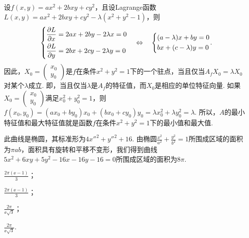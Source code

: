 \begin{solution}
  设$f(x,y)=ax^2+2bxy+cy^2$，且设Lagrange函数$L(x,y)=ax^2+2bxy+cy^2-\lambda(x^2+y^2-1)$，则
  \[
    \left\{
      \begin{aligned}
        & \pp Lx = 2ax + 2by - 2\lambda x = 0 \\
        & \pp Ly = 2bx + 2cy - 2\lambda y = 0
      \end{aligned}
    \right. \quad \Leftrightarrow \quad
    \left\{
      \begin{aligned}
        & (a - \lambda)x + by = 0 \\
        & bx + (c - \lambda)y = 0
      \end{aligned}
    \right..
  \]
  因此，$X_0=\begin{pmatrix}
    x_0 \\
    y_0
  \end{pmatrix}$是$f$在条件$x^2+y^2=1$下的一个驻点，当且仅当$A_fX_0=\lambda X_0$对某个$\lambda$成立. 即，当且仅当$\lambda$是$A_f$的特征值，而$X_0$是相应的单位特征向量. 如果$X_0=\begin{pmatrix}
    x_0 \\
    y_0
  \end{pmatrix}$满足$x_0^2+y_0^2=1$，则$f(x_0,y_0)=(ax_0+by_0)x_0+(bx_0+cy_0)y_0=\lambda x_0^2+\lambda y_0^2=\lambda$. 所以，$A$的最小特征值和最大特征值就是函数$f$在条件$x^2+y^2=1$下的最小值和最大值.
\end{solution}

\begin{solution}
  此曲线是椭圆，其标准形为$4x''^2+y''^2+16$. 由椭圆$\frac{x^2}{a^2}+\frac{y^2}{b^2}=1$所围成区域的面积为$\pi ab$，面积具有旋转和平移不变形，我们得到曲线$5x^2+6xy+5y^2-16x-16y-16=0$所围成区域的面积为$8\pi$.
\end{solution}

\begin{solution}
  \begin{inparaenum}[(a)]
    \item $\frac{2\pi(\ee-1)}3$；
    \item $\frac{2\pi(\ee-1)}3$；
    \item $\frac{2\pi}{\ee\sqrt3}$；
    \item $\frac{2\pi}{\ee\sqrt3}$.
  \end{inparaenum}
\end{solution}

